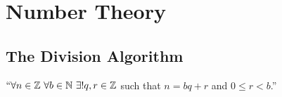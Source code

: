 

\chapter{Number Theory}
    \section{The Division Algorithm}
        \begin{theorem}
            $``\forall n \in \mathbb{Z} \ \forall b \in \mathbb{N} \ \exists ! q, r \in \mathbb{Z}$
            such that $n = bq + r$ and $0 \le r < b$.''
        \end{theorem}
